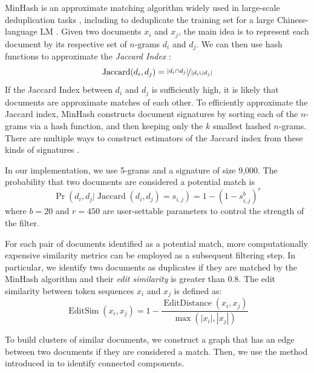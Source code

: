 MinHash \citep{broder1997resemblance} is an approximate matching algorithm widely used in large-scale deduplication tasks \citep{versley2012not,GABRIEL201863,gyawali2020deduplication}, including to deduplicate the training set for a large Chinese-language LM \citep{zeng2021pangualpha}.
Given two documents $x_i$ and $x_j$, the main idea is to represent each document by its respective set of $n$-grams $d_i$ and $d_j$.
We can then use hash functions to approximate the \emph{Jaccard Index} \citep{jaccard1912distribution}:
\begin{equation}
\operatorname{Jaccard}(d_i, d_j) = \nicefrac{|d_i \cap d_j|}{|d_i \cup d_j|}
\end{equation}
If the Jaccard Index between $d_i$ and $d_j$ is sufficiently high, it is likely that documents are approximate matches of each other.
To efficiently approximate the Jaccard index, MinHash constructs document signatures by sorting each of the $n$-grams via a hash function, and then keeping only the $k$ smallest hashed $n$-grams.
There are multiple ways to construct estimators of the Jaccard index from these kinds of signatures \citep{cohen2016min}.

In our implementation, we use 5-grams and a signature of size 9,000. The probability that two documents are considered a potential match is
\begin{equation}
\operatorname{Pr}(d_i, d_j | \operatorname{Jaccard}(d_i, d_j) = s_{i, j}) = 1 - (1 - s_{i, j}^b)^r
\end{equation}
where $b=20$ and $r=450$ are user-settable parameters to control the strength of the filter.

For each pair of documents identified as a potential match, more computationally expensive similarity metrics can be employed as a subsequent filtering step.
In particular, we identify two documents as duplicates if they are matched by the MinHash algorithm and their \emph{edit similarity} is greater than 0.8. The edit similarity between token sequences $x_i$ and $x_j$ is defined as:
\begin{equation}
    \operatorname{EditSim}(x_i, x_j) = 1 - \frac{\operatorname{EditDistance}(x_i, x_j)}{\max(|x_i|, |x_j|)}
\end{equation}

\noindent To build clusters of similar documents, we construct a graph that has an edge between two documents if they are considered a match. Then, we use the method introduced in \citet{lacki2018connected} to identify  connected components.
%

